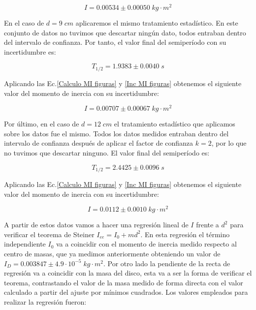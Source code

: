 \documentclass[a4paper,12pt,titlepage]{article}
\begin{document}
\begin{equation}
    I = 0.00534 \pm 0.00050 \; kg \cdot m^2
\end{equation}

En el caso de $d=9 \; cm$ aplicaremos el mismo tratamiento estadístico. En este conjunto de datos no tuvimos que descartar ningún dato, todos entraban dentro del intervalo de confianza. Por tanto, el valor final del semiperíodo con su incertidumbre es:

\begin{equation}
    T_{1/2} = 1.9383 \pm 0.0040 \; s
\end{equation}

Aplicando las Ec.\ref{Calculo MI figuras} y \ref{Inc MI figuras} obtenemos el siguiente valor del momento de inercia con su incertidumbre:

\begin{equation}
    I = 0.00707 \pm 0.00067 \; kg \cdot m^2
\end{equation}

Por último, en el caso de $d=12 \; cm$ el tratamiento estadístico que aplicamos sobre los datos fue el mismo. Todos los datos medidos entraban dentro del intervalo de confianza después de aplicar el factor de confianza $k=2$, por lo que no tuvimos que descartar ninguno. El valor final del semiperíodo es:

\begin{equation}
    T_{1/2} = 2.4425 \pm 0.0096 \; s
\end{equation}

Aplicando las Ec.\ref{Calculo MI figuras} y \ref{Inc MI figuras} obtenemos el siguiente valor del momento de inercia con su incertidumbre:

\begin{equation}
    I = 0.0112 \pm 0.0010 \; kg \cdot m^2
\end{equation}

A partir de estos datos vamos a hacer una regresión lineal de $I$ frente a $d^2$ para verificar el teorema de Steiner $I_{ee} = I_0 + md^2$. En esta regresión el término independiente $I_0$ va a coincidir con el momento de inercia medido respecto al centro de masas, que ya medimos anteriormente obteniendo un valor de $I_D = 0.003847 \pm 4.9 \cdot 10^{-5} \; kg\cdot m^2$. Por otro lado la pendiente de la recta de regresión va a coincidir con la masa del disco, esta va a ser la forma de verificar el teorema, contrastando el valor de la masa medido de forma directa con el valor calculado a partir del ajuste por mínimos cuadrados. Los valores empleados para realizar la regresión fueron:
\end{document}
